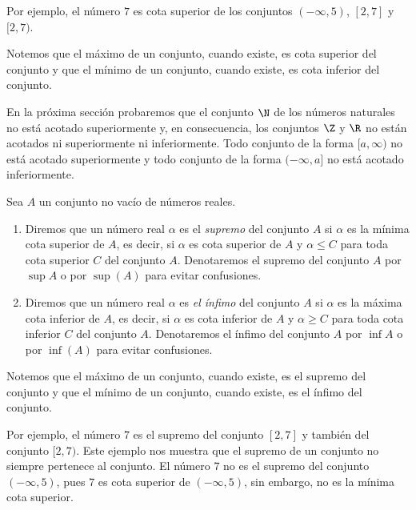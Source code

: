 \documentclass[12pt,a4paper]{book}
\begin{document}
    Por ejemplo, el número $7$ es cota superior de los conjuntos $(-\infty,5)$, $[2,7]$
    y $[2,7)$.

    Notemos que el máximo de un conjunto, cuando existe, es cota superior
    del conjunto y que el mínimo de un conjunto, cuando existe, es cota inferior
    del conjunto.

    En la próxima sección probaremos que el conjunto $\N$ de los números naturales
    no está acotado superiormente y, en consecuencia, los conjuntos $\Z$
    y $\R$ no están acotados ni superiormente ni inferiormente. Todo conjunto de
    la forma $[a,\infty)$ no está acotado superiormente y todo conjunto de la forma
    $(-\infty,a]$ no está acotado inferiormente.

    \begin{definicion}\label{def:15}
        Sea $A$ un conjunto no vacío de números reales.
        \begin{enumerate}
            \item Diremos que un número real $\alpha$ es el \textit{supremo} del conjunto $A$ si $\alpha$ es la
            mínima cota superior de $A$, es decir, si $\alpha$ es cota superior de $A$ y $\alpha\leq C$
            para toda cota superior $C$ del conjunto $A$. Denotaremos el supremo del
            conjunto $A$ por $\sup A$ o por $\sup(A)$ para evitar confusiones.
            \item Diremos que un número real $\alpha$ es \textit{el ínfimo} del conjunto $A$ si $\alpha$ es la máxima
            cota inferior de $A$, es decir, si $\alpha$ es cota inferior de $A$ y $\alpha\geq C$ para toda
            cota inferior $C$ del conjunto $A$. Denotaremos el ínfimo del conjunto $A$ por
            $\inf A$ o por $\inf(A)$ para evitar confusiones.
        \end{enumerate}
    \end{definicion}

    Notemos que el máximo de un conjunto, cuando existe, es el supremo del
    conjunto y que el mínimo de un conjunto, cuando existe, es el ínfimo del
    conjunto.

    Por ejemplo, el número $7$ es el supremo del conjunto $[2,7]$ y también del
    conjunto $[2,7)$. Este ejemplo nos muestra que el supremo de un conjunto no
    siempre pertenece al conjunto. El número $7$ no es el supremo del conjunto
    $(-\infty,5)$, pues $7$ es cota superior de $(-\infty,5)$, sin embargo, no es la mínima
    cota superior.
\end{document}
